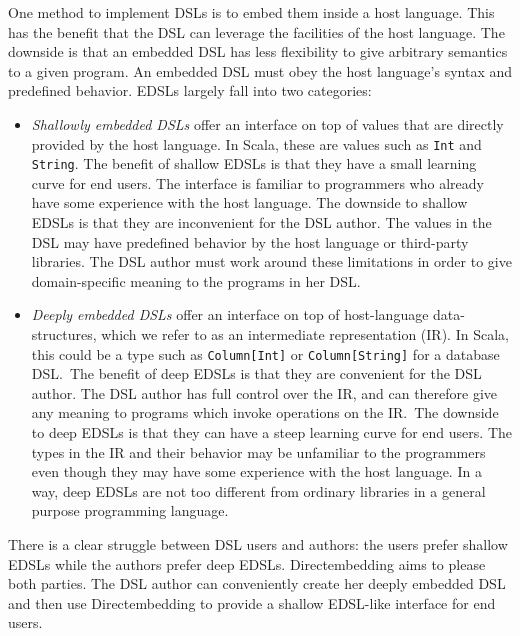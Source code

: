\documentclass[11pt,a4paper]{article}
\begin{document}
One method to implement DSLs is to embed them inside a host language.
This has the benefit that the DSL can leverage the facilities of the host language.
The downside is that an embedded DSL has less flexibility to give arbitrary semantics to a given program.
An embedded DSL must obey the host language's syntax and predefined behavior.
EDSLs largely fall into two categories:
\begin{itemize}
    \item \emph{Shallowly embedded DSLs} offer an interface on top of values that are directly provided by the host language.
        In Scala, these are values such as \texttt{Int} and \texttt{String}.
        The benefit of shallow EDSLs is that they have a small learning curve for end users.
        The interface is familiar to programmers who already have some experience with the host language.
        The downside to shallow EDSLs is that they are inconvenient for the DSL author.
        The values in the DSL may have predefined behavior by the host language or third-party libraries.
        The DSL author must work around these limitations in order to give domain-specific meaning to the programs in her DSL.

    \item \emph{Deeply embedded DSLs} offer an interface on top of host-language data-structures, which we refer to as an intermediate representation (IR).
        In Scala, this could be a type such as \texttt{Column[Int]} or \texttt{Column[String]} for a database DSL.\
        The benefit of deep EDSLs is that they are convenient for the DSL author.
        The DSL author has full control over the IR, and can therefore give any meaning to programs which invoke operations on the IR.\
        The downside to deep EDSLs is that they can have a steep learning curve for end users.
        The types in the IR and their behavior may be unfamiliar to the programmers even though they may have some experience with the host language.
        In a way, deep EDSLs are not too different from ordinary libraries in a general purpose programming language.
\end{itemize}
There is a clear struggle between DSL users and authors: the users prefer shallow EDSLs while the authors prefer deep EDSLs.
Directembedding aims to please both parties.
The DSL author can conveniently create her deeply embedded DSL and then use Directembedding to provide a shallow EDSL-like interface for end users.
\end{document}
